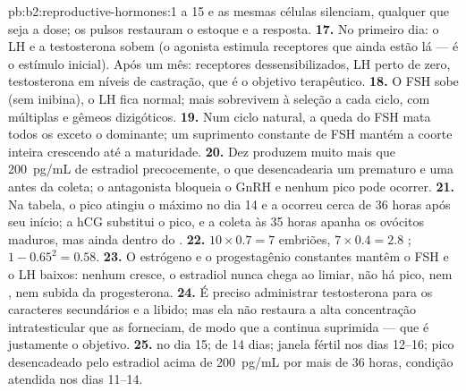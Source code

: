 \begin{solution}{pb:b2:reproductive-hormones:1}
a 15 e as mesmas células silenciam, qualquer que seja a dose; os pulsos
restauram o estoque e a resposta.
\textbf{17.} No primeiro dia: o LH e a testosterona sobem (o agonista
estimula receptores que ainda estão lá --- é o estímulo inicial). Após
um mês: receptores dessensibilizados, LH perto de zero, testosterona em
níveis de castração, que é o objetivo terapêutico.
\textbf{18.} O FSH sobe (sem inibina), o LH fica normal; mais 
sobrevivem à seleção a cada ciclo, com  múltiplas e gêmeos
dizigóticos.
\textbf{19.} Num ciclo natural, a queda do FSH mata todos os 
exceto o dominante; um suprimento constante de FSH mantém a coorte
inteira crescendo até a maturidade.
\textbf{20.} Dez  produzem muito mais que \qty{200}{pg/mL} de
estradiol precocemente, o que desencadearia um  prematuro e
uma  antes da coleta; o antagonista bloqueia o GnRH e nenhum
pico pode ocorrer.
\textbf{21.} Na tabela, o pico atingiu o máximo no dia 14 e a 
ocorreu cerca de 36 horas após seu início; a hCG substitui o pico, e a
coleta às 35 horas apanha os ovócitos maduros, mas ainda dentro do
.
\textbf{22.} $10\times 0.7 = 7$ embriões, $7\times 0.4 = 2.8$
; $1 - 0.65^{2} = 0.58$.
\textbf{23.} O estrógeno e o progestagênio constantes mantêm o FSH e o
LH baixos: nenhum  cresce, o estradiol nunca chega ao limiar,
não há pico, nem , nem subida da progesterona.
\textbf{24.} É preciso administrar testosterona para os caracteres
secundários e a libido; mas ela não restaura a alta concentração
intratesticular que as  forneciam, de modo que a
 continua suprimida --- que é justamente o objetivo.
\textbf{25.}  no dia 15;  de 14 dias; janela fértil
nos dias 12--16; pico desencadeado pelo estradiol acima de
\qty{200}{pg/mL} por mais de 36 horas, condição atendida nos dias
11--14.
\end{solution}
